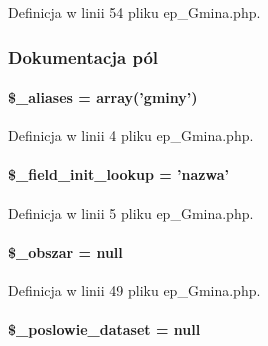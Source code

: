 Definicja w linii 54 pliku ep\-\_\-\-Gmina.\-php.



\subsubsection{Dokumentacja pól}
\hypertarget{classep___gmina_ab4e31d75f0bc5d512456911e5d01366b}{
\paragraph[{\$\-\_\-aliases}]{\setlength{\rightskip}{0pt plus 5cm}\$\-\_\-aliases = array('gminy')}}\label{classep___gmina_ab4e31d75f0bc5d512456911e5d01366b}


Definicja w linii 4 pliku ep\-\_\-\-Gmina.\-php.

\hypertarget{classep___gmina_a4a4d54ae35428077a7c61ec8a5139af3}{
\paragraph[{\$\-\_\-field\-\_\-init\-\_\-lookup}]{\setlength{\rightskip}{0pt plus 5cm}\$\-\_\-field\-\_\-init\-\_\-lookup = 'nazwa'}}\label{classep___gmina_a4a4d54ae35428077a7c61ec8a5139af3}


Definicja w linii 5 pliku ep\-\_\-\-Gmina.\-php.

\hypertarget{classep___gmina_a78dbe56396c80cf6fc9d3f319bb5ec8c}{
\paragraph[{\$\-\_\-obszar}]{\setlength{\rightskip}{0pt plus 5cm}\$\-\_\-obszar = null\hspace{0.3cm}{\ttfamily [protected]}}}\label{classep___gmina_a78dbe56396c80cf6fc9d3f319bb5ec8c}


Definicja w linii 49 pliku ep\-\_\-\-Gmina.\-php.

\hypertarget{classep___gmina_a7035a68c4348c4759daf71ac5c02b72e}{
\paragraph[{\$\-\_\-poslowie\-\_\-dataset}]{\setlength{\rightskip}{0pt plus 5cm}\$\-\_\-poslowie\-\_\-dataset = null\hspace{0.3cm}{\ttfamily [protected]}}}\label{classep___gmina_a7035a68c4348c4759daf71ac5c02b72e}


